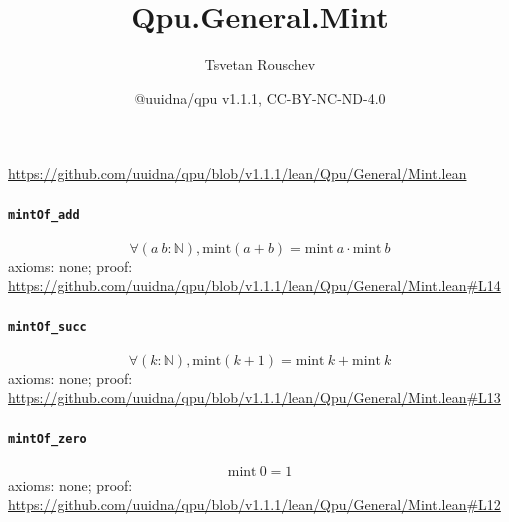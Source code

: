 \documentclass[11pt]{article}
\title{Qpu.General.Mint}
\author{Tsvetan Rouschev}
\date{@uuidna/qpu v1.1.1, CC-BY-NC-ND-4.0}
\begin{document}
\maketitle
\noindent\url{https://github.com/uuidna/qpu/blob/v1.1.1/lean/Qpu/General/Mint.lean}

\paragraph{\texttt{mintOf\_add}}
\[ \forall (a\ b : \mathbb{N}), \mathrm{mint} (a + b) = \mathrm{mint}\ a \cdot \mathrm{mint}\ b \]
\noindent axioms: none; proof: \url{https://github.com/uuidna/qpu/blob/v1.1.1/lean/Qpu/General/Mint.lean\#L14}

\paragraph{\texttt{mintOf\_succ}}
\[ \forall (k : \mathbb{N}), \mathrm{mint} (k + 1) = \mathrm{mint}\ k + \mathrm{mint}\ k \]
\noindent axioms: none; proof: \url{https://github.com/uuidna/qpu/blob/v1.1.1/lean/Qpu/General/Mint.lean\#L13}

\paragraph{\texttt{mintOf\_zero}}
\[ \mathrm{mint}\ 0 = 1 \]
\noindent axioms: none; proof: \url{https://github.com/uuidna/qpu/blob/v1.1.1/lean/Qpu/General/Mint.lean\#L12}
\end{document}
